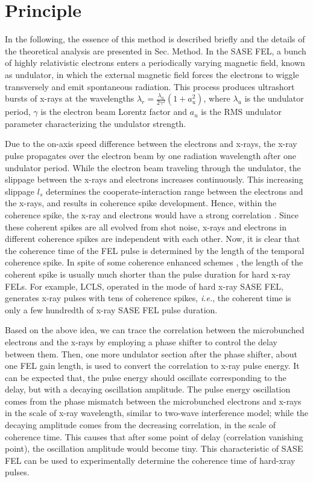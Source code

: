 \documentclass[%
 preprint,
 amsmath,amssymb,
 aps,
 prl,
 superscriptaddress,
 floatfix,
 letter,
]{revtex4-1}
\begin{document}
\section{Principle}
In the following, the essence of this method is described briefly and the details of the theoretical analysis are presented in Sec. Method. In the SASE FEL, a bunch of highly relativistic electrons enters a periodically varying magnetic field, known as undulator, in which the external magnetic field forces the electrons to wiggle transversely and emit spontaneous radiation. This process produces ultrashort bursts of x-rays at the wavelengths  $\lambda_{r}=\frac{\lambda_{u}}{2\gamma^{2}}(1+a_{u}^2)$, where $\lambda_{u}$ is the undulator period, $\gamma$ is the electron beam Lorentz factor and $a_{u}$ is the RMS undulator parameter characterizing the undulator strength.

Due to the on-axis speed difference between the electrons and x-rays, the x-ray pulse propagates over the electron beam by one radiation wavelength after one undulator period. While the electron beam traveling through the undulator, the slippage between the x-rays and electrons increases continuously. This increasing slippage $l_{s}$ determines the cooperate-interaction range between the electrons and the x-rays, and results in coherence spike development. Hence, within the coherence spike, the x-ray and electrons would have a strong correlation \cite{bonifacio1994}. Since these coherent spikes are all evolved from shot noise, x-rays and electrons in different coherence spikes are independent with each other. Now, it is clear that the coherence time of the FEL pulse is determined by the length of the temporal coherence spike. In spite of some coherence enhanced schemes \cite{iSASE,HBSASE,pSASE}, the length of the coherent spike is usually much shorter than the pulse duration for hard x-ray FELs. For example, LCLS, operated in the mode of hard x-ray SASE FEL, generates x-ray pulses with tens of coherence spikes\cite*{bonifacio1984,firstSASE,juhao_modes}, {\it i.e.}, the coherent time is only a few hundredth of x-ray SASE FEL pulse duration.


Based on the above idea, we can trace the correlation between the microbunched electrons and the x-rays by employing a phase shifter to control the delay between them. Then, one more undulator section after the phase shifter, about one FEL gain length, is used to convert the correlation to x-ray pulse energy. It can be expected that, the pulse energy should oscillate corresponding to the delay, but with a decaying oscillation amplitude. The pulse energy oscillation comes from the phase mismatch between the microbunched electrons and x-rays in the scale of x-ray wavelength, similar to two-wave interference model; while the decaying amplitude comes from the decreasing correlation, in the scale of coherence time. This causes that after some point of delay (correlation vanishing point), the oscillation amplitude would become tiny. This characteristic of SASE FEL can be used to experimentally determine the coherence time of hard-xray pulses.
\end{document}
